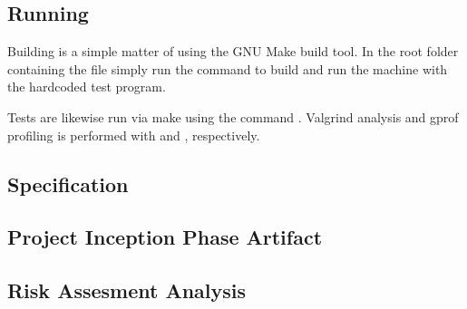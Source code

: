 \subsection{Running \thename{}}
\label{sec:appendix:make}

Building \thename{} is a simple matter of using the GNU Make build tool. In the
root folder containing the file  simply run the command
 to build and run the machine with the hardcoded test program.

Tests are likewise run via make using the command . Valgrind
analysis and gprof profiling is performed with  and
, respectively.

\subsection{\thename{} Specification}
\label{sec:appendix:spec}


\subsection{Project Inception Phase Artifact}
\label{appendix:inception-artifact}


\subsection{Risk Assesment Analysis}
\label{appendix:risk-assessment}

